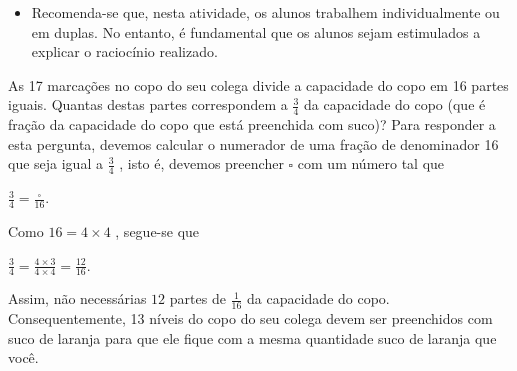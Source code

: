 \begin{multicols}{2}
\begin{objetivos}[label=chap4-ativ11]{}{}
\end{objetivos}

\begin{orientacoes}{}{}

\begin{itemize} %
    \item       Recomenda-se que, nesta atividade, os alunos trabalhem
individualmente ou em duplas. No entanto, é fundamental que os alunos sejam
estimulados a explicar o raciocínio realizado.
\end{itemize} %




\end{orientacoes}

\begin{solucao}{}{}
  As 17 marcações no copo do seu colega divide a capacidade do copo em 16 partes
iguais. Quantas destas partes correspondem a   $\frac{3}{4}$   da capacidade do
copo (que é fração da capacidade do copo que está preenchida com suco)? Para
responder a esta pergunta, devemos calcular o numerador de uma fração de
denominador 16 que seja igual a   $\frac{3}{4}$  , isto é, devemos preencher
$\square$   com um número tal que

  $\frac{3}{4} = \frac{\square}{16}$.

  Como   $16 = 4 \times 4$  , segue-se que

  $\frac{3}{4} = \frac{4 \times 3}{4 \times 4} = \frac{12}{16}$.

  Assim, não necessárias   $12$   partes de   $\frac{1}{16}$   da capacidade do
copo. Consequentemente,
  13 níveis do copo do seu colega devem ser preenchidos com suco de laranja para
que ele fique com a mesma quantidade suco de laranja que você.


\begin{center}
\end{center}
\end{solucao}
\end{multicols}
